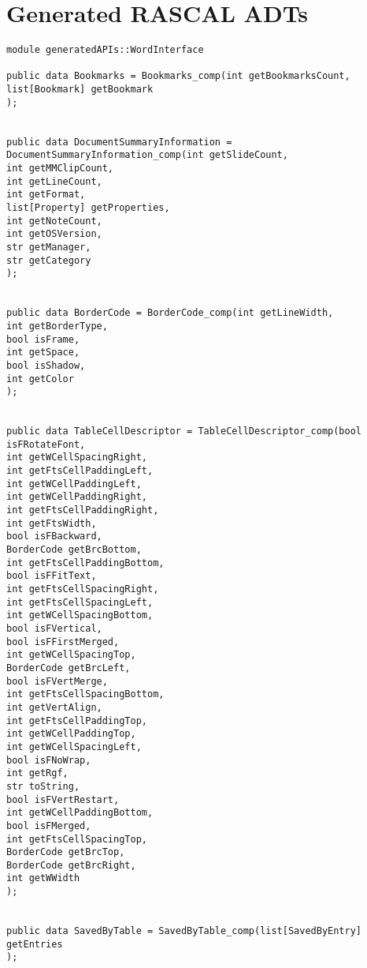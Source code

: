 
\chapter{Generated RASCAL ADTs } %

\label{AppendixB} %


\begin{lstlisting}[label=lst:wordInterface,caption=The generated ADT corresponding to HWPF data structure.]
module generatedAPIs::WordInterface

public data Bookmarks = Bookmarks_comp(int getBookmarksCount,
list[Bookmark] getBookmark
);


public data DocumentSummaryInformation = DocumentSummaryInformation_comp(int getSlideCount,
int getMMClipCount,
int getLineCount,
int getFormat,
list[Property] getProperties,
int getNoteCount,
int getOSVersion,
str getManager,
str getCategory
);


public data BorderCode = BorderCode_comp(int getLineWidth,
int getBorderType,
bool isFrame,
int getSpace,
bool isShadow,
int getColor
);


public data TableCellDescriptor = TableCellDescriptor_comp(bool isFRotateFont,
int getWCellSpacingRight,
int getFtsCellPaddingLeft,
int getWCellPaddingLeft,
int getWCellPaddingRight,
int getFtsCellPaddingRight,
int getFtsWidth,
bool isFBackward,
BorderCode getBrcBottom,
int getFtsCellPaddingBottom,
bool isFFitText,
int getFtsCellSpacingRight,
int getFtsCellSpacingLeft,
int getWCellSpacingBottom,
bool isFVertical,
bool isFFirstMerged,
int getWCellSpacingTop,
BorderCode getBrcLeft,
bool isFVertMerge,
int getFtsCellSpacingBottom,
int getVertAlign,
int getFtsCellPaddingTop,
int getWCellPaddingTop,
int getWCellSpacingLeft,
bool isFNoWrap,
int getRgf,
str toString,
bool isFVertRestart,
int getWCellPaddingBottom,
bool isFMerged,
int getFtsCellSpacingTop,
BorderCode getBrcTop,
BorderCode getBrcRight,
int getWWidth
);


public data SavedByTable = SavedByTable_comp(list[SavedByEntry] getEntries
);



\end{lstlisting}
